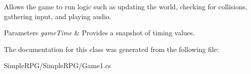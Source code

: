 Allows the game to run logic such as updating the world, checking for collisions, gathering input, and playing audio. 


\begin{DoxyParams}{Parameters}
{\em game\-Time} & Provides a snapshot of timing values.\\
\hline
\end{DoxyParams}


The documentation for this class was generated from the following file\-:\begin{DoxyCompactItemize}
\item 
Simple\-R\-P\-G/\-Simple\-R\-P\-G/Game1.\-cs\end{DoxyCompactItemize}

